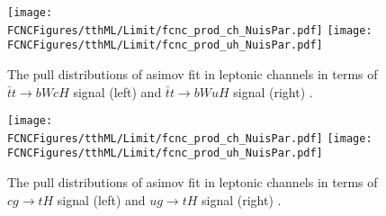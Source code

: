 \begin{figure}[H]
\centering
\texttt{[image: \\FCNCFigures/tthML/Limit/fcnc\_prod\_ch\_NuisPar.pdf]}
\texttt{[image: \\FCNCFigures/tthML/Limit/fcnc\_prod\_uh\_NuisPar.pdf]}
\caption{ The pull distributions of asimov fit in leptonic channels  in terms of $\bar{t}t\to bWcH$ signal (left) and $\bar{t}t\to bWuH$ signal (right) . }
\label{fig:fcnc_tthml_chuh_NuisPar}
\end{figure}


\begin{figure}[H]
\centering
\texttt{[image: \\FCNCFigures/tthML/Limit/fcnc\_prod\_ch\_NuisPar.pdf]}
\texttt{[image: \\FCNCFigures/tthML/Limit/fcnc\_prod\_uh\_NuisPar.pdf]}
\caption{ The pull distributions of asimov fit in leptonic channels  in terms of $cg\to tH$ signal (left) and $ug\to tH$ signal (right) . }
\label{fig:fcnc_tthml_prod_chuh_NuisPar}
\end{figure}




